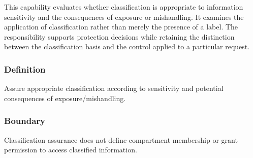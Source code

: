 This capability evaluates whether classification is appropriate to information sensitivity and the consequences of exposure or mishandling. It examines the application of classification rather than merely the presence of a label. The responsibility supports protection decisions while retaining the distinction between the classification basis and the control applied to a particular request.

\subsubsection*{Definition}

Assure appropriate classification according to sensitivity and potential consequences of exposure/\allowbreak{}mishandling.

\subsubsection*{Boundary}

Classification assurance does not define compartment membership or grant permission to access classified information.

